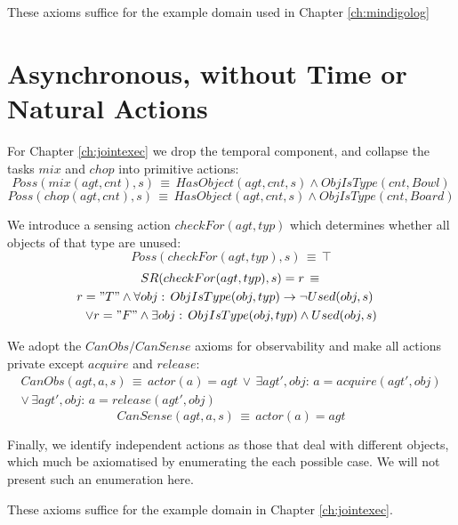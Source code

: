 These axioms suffice for the example domain used in Chapter \ref{ch:mindigolog}


\section*{Asynchronous, without Time or Natural Actions}

For Chapter \ref{ch:jointexec} we drop the temporal component, and
collapse the tasks $mix$ and $chop$ into primitive actions:\[
Poss(mix(agt,cnt),s)\,\equiv\, HasObject(agt,cnt,s)\wedge ObjIsType(cnt,Bowl)\]
\[
Poss(chop(agt,cnt),s)\,\equiv\, HasObject(agt,cnt,s)\wedge ObjIsType(cnt,Board)\]


We introduce a sensing action $checkFor(agt,typ)$ which determines
whether all objects of that type are unused:\[
Poss(checkFor(agt,typ),s)\,\equiv\,\top\]
\begin{multline*}
SR(checkFor(agt,typ),s)=r\,\equiv\,\\
\shoveright{r="T"\wedge\forall obj:\, ObjIsType(obj,typ)\rightarrow\neg Used(obj,s)}\\
\vee r="F"\wedge\exists obj:\, ObjIsType(obj,typ)\wedge Used(obj,s)\end{multline*}


We adopt the $CanObs/CanSense$ axioms for observability and make
all actions private except $acquire$ and $release$:\begin{multline*}
CanObs(agt,a,s)\,\equiv\, actor(a)=agt\,\vee\,\exists agt',obj:\, a=acquire(agt',obj)\\
\vee\,\exists agt',obj:\, a=release(agt',obj)\end{multline*}
\[
CanSense(agt,a,s)\,\equiv\, actor(a)=agt\]


Finally, we identify independent actions as those that deal with different
objects, which much be axiomatised by enumerating the each possible
case. We will not present such an enumeration here.

These axioms suffice for the example domain in Chapter \ref{ch:jointexec}.

